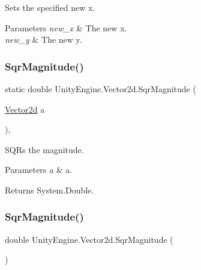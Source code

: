 Sets the specified new x. 


\begin{DoxyParams}{Parameters}
{\em new\+\_\+x} & The new x.\\
\hline
{\em new\+\_\+y} & The new y.\\
\hline
\end{DoxyParams}
\mbox{\label{struct_unity_engine_1_1_vector2d_a3da9a9a2a6d709397301e6b983b3dc0a}} 
\subsubsection{\texorpdfstring{Sqr\+Magnitude()}{SqrMagnitude()}\hspace{0.1cm}{\footnotesize\ttfamily [1/2]}}
{\footnotesize\ttfamily static double Unity\+Engine.\+Vector2d.\+Sqr\+Magnitude (\begin{DoxyParamCaption}\item[{\hyperlink{struct_unity_engine_1_1_vector2d}{Vector2d}}]{a }\end{DoxyParamCaption})\hspace{0.3cm}{\ttfamily [inline]}, {\ttfamily [static]}}



S\+Q\+Rs the magnitude. 


\begin{DoxyParams}{Parameters}
{\em a} & a.\\
\hline
\end{DoxyParams}
\begin{DoxyReturn}{Returns}
System.\+Double.
\end{DoxyReturn}
\mbox{\label{struct_unity_engine_1_1_vector2d_a4fbca0566c6b1e6b1f98dad63bfe63af}} 
\subsubsection{\texorpdfstring{Sqr\+Magnitude()}{SqrMagnitude()}\hspace{0.1cm}{\footnotesize\ttfamily [2/2]}}
{\footnotesize\ttfamily double Unity\+Engine.\+Vector2d.\+Sqr\+Magnitude (\begin{DoxyParamCaption}{ }\end{DoxyParamCaption})\hspace{0.3cm}{\ttfamily [inline]}}



